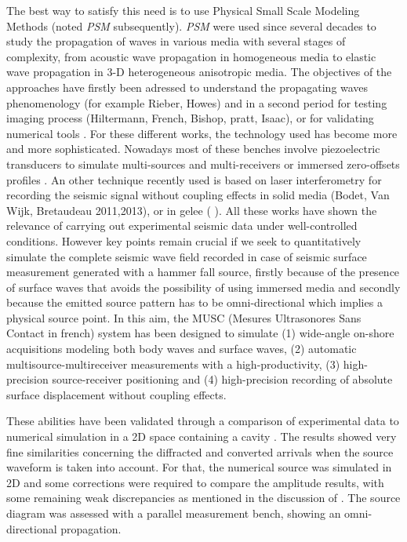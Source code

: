 \documentclass[manuscript,revised]{geophysics}
\newcommand{\psm}{\textit{PSM} }
\newcommand{\thrd}{3-D }
\begin{document}
\noindent The best way to satisfy this need is to use Physical Small Scale Modeling Methods (noted \psm subsequently). \psm were used since several decades to study the propagation of waves in various media with several stages of complexity, from acoustic wave propagation in homogeneous media to elastic wave propagation in \thrd heterogeneous anisotropic media. The objectives of the approaches have firstly been adressed to understand the propagating waves phenomenology (for example  Rieber, Howes) and in a second period for testing imaging process (Hiltermann, French, Bishop, pratt, Isaac), or for validating numerical tools \citep{Favretto_NMT_2013}. For these different works, the technology used has become more and more sophisticated. Nowadays most of these benches involve piezoelectric transducers to simulate multi-sources and multi-receivers \citep{Wong_SPM_2009} or immersed zero-offsets profiles \citep{Favretto_NMT_2013}. An other technique recently used is based on laser interferometry for recording the seismic signal without coupling effects in solid media (Bodet, Van Wijk, Bretaudeau 2011,2013), or in gelee ( ). All these works have shown the relevance of carrying out experimental seismic data under well-controlled conditions. However key points remain crucial if we seek to quantitatively simulate the complete seismic wave field recorded in case of seismic surface measurement generated with a hammer fall source, firstly because of the presence of surface waves that avoids the possibility of using immersed media and secondly because the emitted source pattern has to be omni-directional which implies a physical source point. In this aim, the MUSC (Mesures Ultrasonores Sans Contact in french) system has been designed \citep{Bretaudeau_SSM_2011} to simulate (1) wide-angle on-shore acquisitions modeling both body waves and surface waves, (2) automatic multisource-multireceiver measurements with a high-productivity, (3) high-precision source-receiver positioning and (4) high-precision recording of absolute surface displacement without coupling effects. 

\noindent These abilities have been validated through a comparison of experimental data to numerical simulation in a 2D space containing a cavity \citep{Bretaudeau_SSM_2011}. The results showed very fine similarities concerning the diffracted and converted arrivals when the source waveform is taken into account. For that, the numerical source was simulated in 2D and some corrections were required to compare the amplitude results, with some remaining weak discrepancies as mentioned in the discussion of \citet{Bretaudeau_SSM_2011}. The source diagram was assessed with a parallel measurement bench, showing an omni-directional propagation. %
\end{document}
